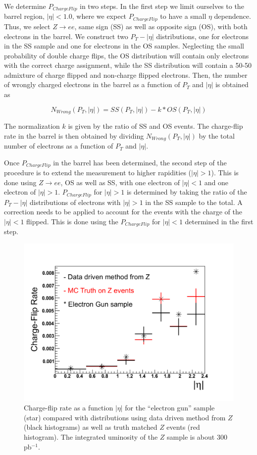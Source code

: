 We determine $P_{ChargeFlip}$ in two steps.  In the first step we limit ourselves
to the barrel region, $|\eta| < 1.0$, where we expect $P_{ChargeFlip}$ to have 
a small $\eta$ dependence.  Thus, we select $Z \to ee$, same sign (SS) as well as
opposite sign (OS), with both electrons in the barrel.  
We construct two $P_T-|\eta|$
distributions, one for electrons in the SS sample and 
one for electrons in the OS samples.  Neglecting the small 
probability of double charge flips, the OS distribution will contain only
electrons with the correct charge assignment, while the SS distribution
will contain a 50-50 admixture of charge flipped and non-charge flipped
electrons.  Then, 
the number of wrongly charged electrons in the barrel as a function
of $P_T$ and $|\eta|$ is obtained as

\begin{equation}
  N_{Wrong}(P_T, |\eta|) = SS(P_T, |\eta|) - k * OS(P_T, |\eta|) 
\end{equation}

The normalization $k$ is given by the ratio of SS and OS events.
The charge-flip rate in the barrel is then obtained by dividing 
$N_{Wrong}(P_T, |\eta|)$ by the total number of electrons as a 
function of $P_T$ and $|\eta|$.

Once $P_{ChargeFlip}$ in the barrel has been determined, the second step
of the procedure is to extend the measurement to higher rapidities 
($|\eta|>1$).  This is done using $Z \to ee$, OS as well as SS, with 
one electron of $|\eta|<1$ and one electron of $|\eta|>1$.  
$P_{ChargeFlip}$ for $|\eta|>1$ is determined by taking the ratio
of the $P_T-|\eta|$ distributions of electrons with 
$|\eta|>1$ in the SS sample to the total.  A correction needs to 
be applied to account for the events with the charge of the
$|\eta|<1$ flipped.  This is done using the  $P_{ChargeFlip}$
for $|\eta|<1$ determined in the first step.


\begin{figure}[htb]
\begin{center}
\includegraphics[width=0.7\linewidth]{figs/fr_rate.pdf}
\caption{Charge-flip rate as a function $|\eta|$ for the ``electron gun'' sample (star) compared with 
distributions using data driven method from $Z$ (black histograms) as well as truth matched $Z$ events 
(red histogram).
The integrated uminosity of the $Z$ sample is about 300 pb$^{-1}$.  
\label{fig:charge_fliprate}}
\end{center}
\end{figure}


